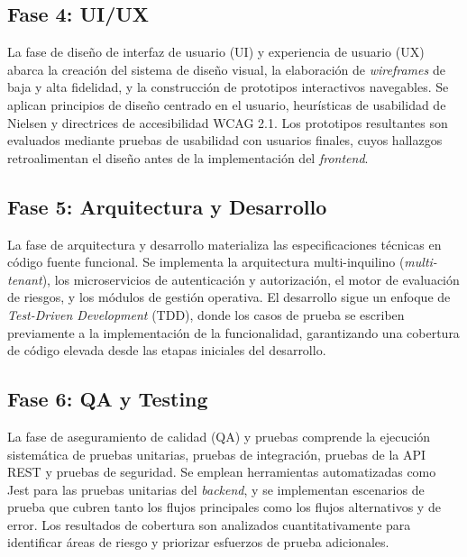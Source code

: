 \subsection{Fase 4: UI/UX}
\label{subsec:fase4-uiux}

La fase de dise\~no de interfaz de usuario (UI) y experiencia de usuario (UX)
abarca la creaci\'on del sistema de dise\~no visual, la elaboraci\'on de
\textit{wireframes} de baja y alta fidelidad, y la construcci\'on de prototipos
interactivos navegables. Se aplican principios de dise\~no centrado en el
usuario, heur\'isticas de usabilidad de Nielsen y directrices de accesibilidad
WCAG 2.1. Los prototipos resultantes son evaluados mediante pruebas de
usabilidad con usuarios finales, cuyos hallazgos retroalimentan el dise\~no
antes de la implementaci\'on del \textit{frontend}.

\subsection{Fase 5: Arquitectura y Desarrollo}
\label{subsec:fase5-arquitectura}

La fase de arquitectura y desarrollo materializa las especificaciones t\'ecnicas
en c\'odigo fuente funcional. Se implementa la arquitectura multi-inquilino
(\textit{multi-tenant}), los microservicios de autenticaci\'on y autorizaci\'on,
el motor de evaluaci\'on de riesgos, y los m\'odulos de gesti\'on operativa.
El desarrollo sigue un enfoque de \textit{Test-Driven Development} (TDD),
donde los casos de prueba se escriben previamente a la implementaci\'on de la
funcionalidad, garantizando una cobertura de c\'odigo elevada desde las etapas
iniciales del desarrollo.

\subsection{Fase 6: QA y Testing}
\label{subsec:fase6-qa}

La fase de aseguramiento de calidad (QA) y pruebas comprende la ejecuci\'on
sistem\'atica de pruebas unitarias, pruebas de integraci\'on, pruebas de la
API REST y pruebas de seguridad. Se emplean herramientas automatizadas como
Jest para las pruebas unitarias del \textit{backend}, y se implementan
escenarios de prueba que cubren tanto los flujos principales como los flujos
alternativos y de error. Los resultados de cobertura son analizados
cuantitativamente para identificar \'areas de riesgo y priorizar esfuerzos
de prueba adicionales.


